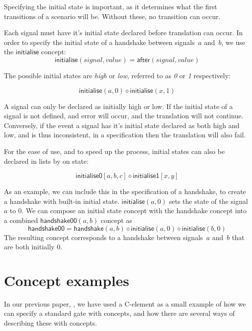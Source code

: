 \documentclass[british,conference,compsoc]{IEEEtran}
\begin{document}
Specifying the initial state is important, as it determines what the first transitions
of a scenario will be. Without these, no transition can occur.

Each signal must have it's initial state declared before translation can occur. 
In order to specify the initial state of a handshake between signals~$a$
and~$b$, we use the $\mathsf{initialise}$ concept:
\[
\mathsf{initialise}(\mathit{signal},\mathit{value})=\mathsf{after}(signal,
value)
\]

\noindent The possible initial states are \emph{high} or \emph{low}, referred to as \emph{0} 
or \emph{1} respectively:

\[
\mathsf{initialise}(a,0) \diamond \mathsf{initialise}(x, 1)
\]

\noindent A signal can only be declared as initially high or low. If the initial state of a signal is 
not defined, and error will occur, and the translation will not continue. Conversely, 
if the event a signal has it's initial state declared as both high and low,
and is thus inconsistent, in a specification then the translation will also fail.

For the ease of use, and to speed up the process, initial states can also be declared
in lists by on state:

\[
\mathsf{initialise0} [a, b, c] \diamond \mathsf{initialise1} [x, y]
\]


\noindent As an example, we can include this in the specification of a handshake, to 
create a handshake with built-in initial state.
$\mathsf{initialise}(a, 0)$ sets the state of the signal
$a$ to $0$. We can compose an initial state concept with the handshake concept
into a combined $\mathsf{handshake00}(a, b)$ concept as
\[
\mathsf{handshake00} = \mathsf{handshake}(a, b) \diamond \mathsf{initialise}(a, 0) \diamond
\mathsf{initialise}(b, 0)
\]
The resulting concept corresponds to a handshake between signals~$a$
and~$b$ that are both initially $0$.


\section{Concept examples \label{sec:examples}}

In our previous paper, \cite{2015_Beaumont_MEMOCODE}, we have 
used a C-element as a small example of how we can specify a standard gate with concepts,
and how there are several ways of describing these with concepts. 
\end{document}
